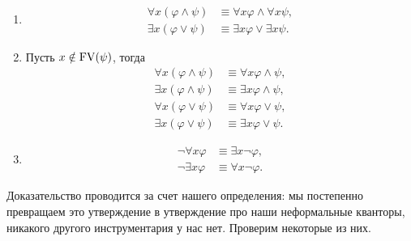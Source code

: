 \begin{theorem}~
    \begin{enumerate}
        \item \begin{align}
            \forall x (\varphi \land \psi) &\equiv \forall x \varphi \land \forall x \psi, \\
            \exists x (\varphi \lor \psi) &\equiv \exists x \varphi \lor \exists x \psi.
        \end{align}
        \item Пусть $x \notin \mathrm{FV}(\psi)$, тогда \begin{align}
            \forall x (\varphi \land \psi) &\equiv \forall x \varphi \land \psi, \\
            \exists x (\varphi \land \psi) &\equiv \exists x \varphi \land \psi, \\
            \forall x (\varphi \lor \psi) &\equiv \forall x \varphi \lor \psi, \\
            \exists x (\varphi \lor \psi) &\equiv \exists x \varphi \lor \psi.
        \end{align}
        \item \begin{align}
            \neg \forall x \varphi &\equiv \exists x \neg \varphi, \\
            \neg \exists x \varphi &\equiv \forall x \neg \varphi.
        \end{align}
    \end{enumerate}
\end{theorem}

Доказательство проводится за счет нашего определения: мы постепенно превращаем это утверждение в утверждение про наши неформальные кванторы, никакого другого инструментария у нас нет.
Проверим некоторые из них.

